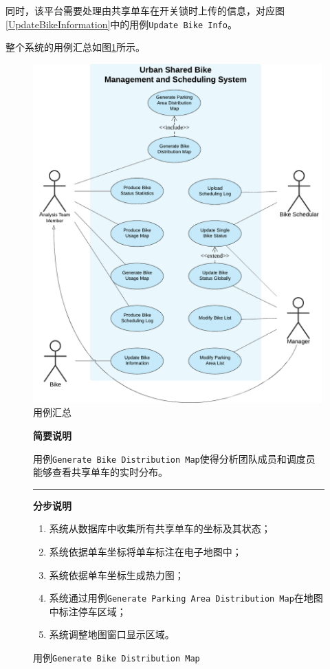 同时，该平台需要处理由共享单车在开关锁时上传的信息，对应图\ref{UpdateBikeInformation}中的用例\texttt{Update Bike Info}。

整个系统的用例汇总如图\ref{UseCase}所示。

\begin{figure}[!htbp]
    \centering
    \includegraphics[width=0.99\textwidth]{figures/UseCase.pdf}
    \caption{用例汇总}\label{UseCase}
\end{figure}


\begin{figure}
    \centering
 \begin{mdframed}[leftmargin=0pt, rightmargin=0pt]
    \textbf{简要说明}

    用例\texttt{Generate Bike Distribution Map}使得分析团队成员和调度员能够查看共享单车的实时分布。

\noindent\rule{\textwidth}{0.5pt} %
    \textbf{分步说明}

    \begin{enumerate}
        \item 系统从数据库中收集所有共享单车的坐标及其状态；
        \item 系统依据单车坐标将单车标注在电子地图中；
        \item 系统依据单车坐标生成热力图；
        \item 系统通过用例\texttt{Generate Parking Area Distribution Map}在地图中标注停车区域；
        \item 系统调整地图窗口显示区域。
    \end{enumerate}
\end{mdframed}   
\caption{用例\texttt{Generate Bike Distribution Map}}\label{GenerateBikeDistributionMap}
\end{figure}

